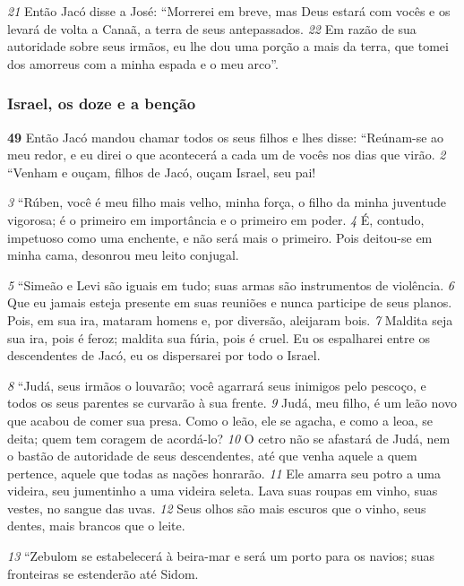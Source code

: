 \bigskip
\textit{\tiny 21}
Então Jacó disse a José: “Morrerei em breve, mas Deus estará com vocês e os
levará de volta a Canaã, a terra de seus antepassados. 
\textit{\tiny 22}
Em razão de sua
autoridade sobre seus irmãos, eu lhe dou uma porção a mais da terra,
que
tomei dos amorreus com a minha espada e o meu arco”.

\bigskip
\subsubsection*{Israel, os doze e a benção}
  \textbf{\large 49} Então Jacó mandou chamar todos os seus filhos e lhes disse: “Reúnam-se
ao meu redor, e eu direi o que acontecerá a cada um de vocês nos dias que virão. 
\textit{\tiny 2} 
“Venham e ouçam, filhos de Jacó,
       ouçam Israel, seu pai! 

\bigskip
\textit{\tiny 3} 
“Rúben, você é meu filho mais velho, minha força,
      o filho da minha juventude vigorosa;
      é o primeiro em importância e o primeiro em poder. 
\textit{\tiny 4} 
É, contudo, impetuoso como uma enchente,
      e não será mais o primeiro.
    Pois deitou-se em minha cama,  desonrou meu leito conjugal. 

\bigskip
\textit{\tiny 5} 
“Simeão e Levi são iguais em tudo;
  suas armas são instrumentos de violência. 
\textit{\tiny 6} 
Que eu jamais esteja presente em suas reuniões
  e nunca participe de seus planos.
Pois, em sua ira, mataram homens
  e, por diversão, aleijaram bois. 
\textit{\tiny 7} 
Maldita seja sua ira, pois é feroz;
  maldita sua fúria, pois é cruel.
Eu os espalharei entre os descendentes de Jacó,
  eu os dispersarei por todo o Israel. 

\bigskip
\textit{\tiny 8} 
“Judá, seus irmãos o louvarão;
   você agarrará seus inimigos pelo pescoço,
   e todos os seus parentes se curvarão à sua frente. 
\textit{\tiny 9} 
Judá, meu filho, é um leão novo
   que acabou de comer sua presa.
Como o leão, ele se agacha, e como a leoa, se deita;
   quem tem coragem de acordá-lo?
\textit{\tiny 10}
O cetro não se afastará de Judá,
   nem o bastão de autoridade de seus descendentes,
até que venha aquele a quem pertence,
   aquele que todas as nações honrarão.
\textit{\tiny 11}
Ele amarra seu potro a uma videira,
   seu jumentinho a uma videira seleta.
Lava suas roupas em vinho,
   suas vestes, no sangue das uvas.
\textit{\tiny 12}
Seus olhos são mais escuros que o vinho,
   seus dentes, mais brancos que o leite.

\bigskip
\textit{\tiny 13}
“Zebulom se estabelecerá à beira-mar
  e será um porto para os navios;
  suas fronteiras se estenderão até Sidom.

